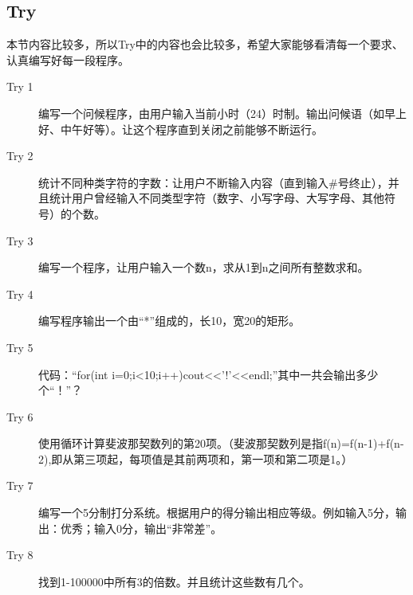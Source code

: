 \subsection{Try}
本节内容比较多，所以Try中的内容也会比较多，希望大家能够看清每一个要求、认真编写好每一段程序。
\begin{description}
	\item[Try 1]编写一个问候程序，由用户输入当前小时（24）时制。输出问候语（如早上好、中午好等）。让这个程序直到关闭之前能够不断运行。
	\item[Try 2]统计不同种类字符的字数：让用户不断输入内容（直到输入#号终止），并且统计用户曾经输入不同类型字符（数字、小写字母、大写字母、其他符号）的个数。
	\item[Try 3]编写一个程序，让用户输入一个数n，求从1到n之间所有整数求和。
	\item[Try 4]编写程序输出一个由“*”组成的，长10，宽20的矩形。
	\item[Try 5]代码：“for(int i=0;i<10;i++)cout<<'!'<<endl;”其中一共会输出多少个“！”？
	\item[Try 6]使用循环计算斐波那契数列的第20项。（斐波那契数列是指f(n)=f(n-1)+f(n-2),即从第三项起，每项值是其前两项和，第一项和第二项是1。）
	\item[Try 7]编写一个5分制打分系统。根据用户的得分输出相应等级。例如输入5分，输出：优秀；输入0分，输出“非常差”。
	\item[Try 8]找到1-100000中所有3的倍数。并且统计这些数有几个。
\end{description}

